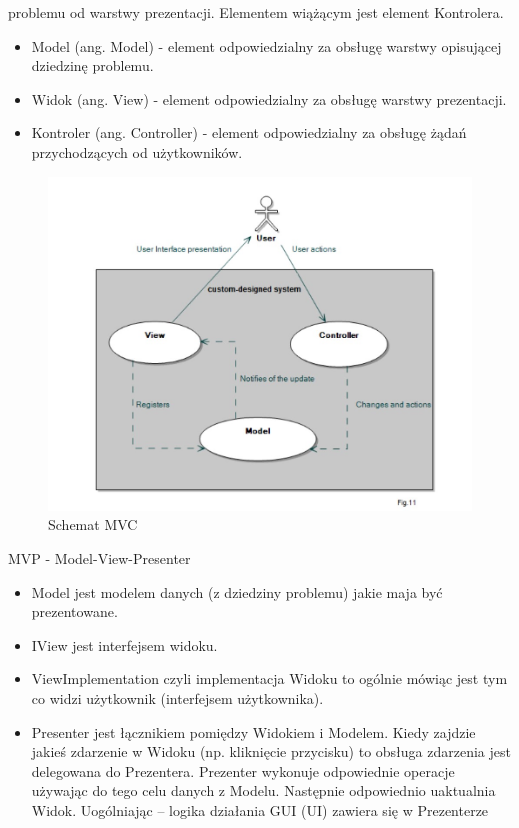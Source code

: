 \documentclass[a4paper,12pt,oneside]{book}
\begin{document}
                problemu od warstwy prezentacji. Elementem wiążącym jest element 
                Kontrolera.
                \begin{itemize}
                    \item Model (ang. Model) - element odpowiedzialny za obsługę warstwy 
                    opisującej dziedzinę problemu.
                    \item Widok (ang. View) - element odpowiedzialny za obsługę warstwy 
                    prezentacji.
                    \item Kontroler (ang. Controller) - element odpowiedzialny za obsługę 
                    żądań przychodzących od użytkowników.
                \end{itemize}
                \begin{figure}[h]
                    \centering
                    \includegraphics[width=\textwidth/2]{images/mvc.jpg}
                    \caption{Schemat MVC}
                    \label{fig:twojastara3}
                \end{figure}
                MVP - Model-View-Presenter
                \begin{itemize}
                    \item Model jest modelem danych (z dziedziny problemu) jakie maja być 
                    prezentowane. 
                    \item IView jest interfejsem widoku.
                    \item ViewImplementation czyli implementacja Widoku to ogólnie mówiąc jest 
                    tym co widzi użytkownik (interfejsem użytkownika). 
                    \item Presenter jest łącznikiem pomiędzy Widokiem i Modelem. Kiedy zajdzie 
                    jakieś zdarzenie w Widoku (np. kliknięcie przycisku) to obsługa zdarzenia 
                    jest delegowana do Prezentera. Prezenter wykonuje odpowiednie operacje 
                    używając do tego celu danych z Modelu. Następnie odpowiednio uaktualnia 
                    Widok. Uogólniając – logika działania GUI (UI) zawiera się w Prezenterze
                \end{itemize}
\end{document}
